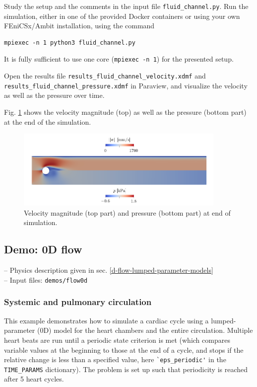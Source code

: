 \documentclass[a4paper,12pt]{report}
\begin{document}
Study the setup and the comments in the input file \verb"fluid_channel.py". Run the simulation, either in one of the provided Docker containers or using your own FEniCSx/Ambit installation, using the command

\begin{verbatim}
mpiexec -n 1 python3 fluid_channel.py
\end{verbatim}

It is fully sufficient to use one core (\verb"mpiexec -n 1") for the presented setup.

Open the results file \verb"results_fluid_channel_velocity.xdmf" and \\ \verb"results_fluid_channel_pressure.xdmf" in Paraview, and visualize the velocity as well as the pressure over time.

Fig. \ref{fig:channel_results} shows the velocity magnitude (top) as well as the pressure (bottom part) at the end of the simulation.

\begin{figure}[ht]
\centering
\includegraphics[width=0.9\textwidth]{fig/channel_results.png}
\caption{Velocity magnitude (top part) and pressure (bottom part) at end of simulation.}
\label{fig:channel_results}
\end{figure}


\subsection{Demo: 0D flow}\label{demo-0d-flow}

-- Physics description given in sec. \ref{d-flow-lumped-parameter-models}\\

-- Input files: \verb"demos/flow0d"

\subsubsection*{Systemic and pulmonary circulation}

This example demonstrates how to simulate a cardiac cycle using a lumped-parameter (0D) model for the heart chambers and the entire circulation. Multiple heart beats are run
until a periodic state criterion is met (which compares variable values at the beginning to those at the end of a cycle, and stops if the relative change is less than
a specified value, here \verb"`eps_periodic'" in the \verb"TIME_PARAMS" dictionary). The problem is set up such that periodicity is reached after 5 heart cycles.
\end{document}
